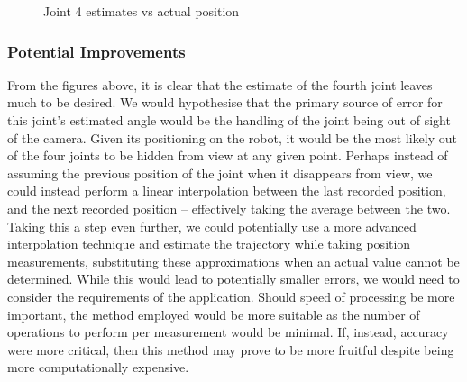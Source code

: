 \documentclass[11pt]{article}
\begin{document}
\begin{figure}[!htb]
    \caption{Joint 4 estimates vs actual position}
\endminipage\hfill
\end{figure}

\subsubsection{Potential Improvements}
From the figures above, it is clear that the estimate of the fourth joint leaves much to be desired.
We would hypothesise that the primary source of error for this joint's estimated angle would be the handling of the joint being out of sight of the camera.
Given its positioning on the robot, it would be the most likely out of the four joints to be hidden from view at any given point.
Perhaps instead of assuming the previous position of the joint when it disappears from view, we could instead perform a linear interpolation between the last recorded position, and the next recorded position -- effectively taking the average between the two.
Taking this a step even further, we could potentially use a more advanced interpolation technique and estimate the trajectory while taking position measurements, substituting these approximations when an actual value cannot be determined.
While this would lead to potentially smaller errors, we would need to consider the requirements of the application.
Should speed of processing be more important, the method employed would be more suitable as the number of operations to perform per measurement would be minimal.
If, instead, accuracy were more critical, then this method may prove to be more fruitful despite being more computationally expensive. 
\end{document}
